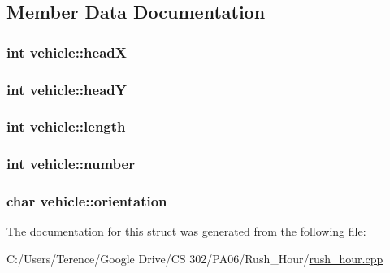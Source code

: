 \subsection{Member Data Documentation}
\hypertarget{structvehicle_ab525f11ff214cc0bb23e7ddb9f8265ad}{
\subsubsection[{head\-X}]{\setlength{\rightskip}{0pt plus 5cm}int vehicle\-::head\-X}}\label{structvehicle_ab525f11ff214cc0bb23e7ddb9f8265ad}
\hypertarget{structvehicle_a63b425a69ba561fcaa9176eebd282f93}{
\subsubsection[{head\-Y}]{\setlength{\rightskip}{0pt plus 5cm}int vehicle\-::head\-Y}}\label{structvehicle_a63b425a69ba561fcaa9176eebd282f93}
\hypertarget{structvehicle_ac24eafe4009bbc892ddeb9f522cd7cd0}{
\subsubsection[{length}]{\setlength{\rightskip}{0pt plus 5cm}int vehicle\-::length}}\label{structvehicle_ac24eafe4009bbc892ddeb9f522cd7cd0}
\hypertarget{structvehicle_a0499f4add2a85479bfb87f18f9bcab9e}{
\subsubsection[{number}]{\setlength{\rightskip}{0pt plus 5cm}int vehicle\-::number}}\label{structvehicle_a0499f4add2a85479bfb87f18f9bcab9e}
\hypertarget{structvehicle_a79550d470251103a9634b1393e83317d}{
\subsubsection[{orientation}]{\setlength{\rightskip}{0pt plus 5cm}char vehicle\-::orientation}}\label{structvehicle_a79550d470251103a9634b1393e83317d}


The documentation for this struct was generated from the following file\-:\begin{DoxyCompactItemize}
\item 
C\-:/\-Users/\-Terence/\-Google Drive/\-C\-S 302/\-P\-A06/\-Rush\-\_\-\-Hour/\hyperlink{rush__hour_8cpp}{rush\-\_\-hour.\-cpp}\end{DoxyCompactItemize}
